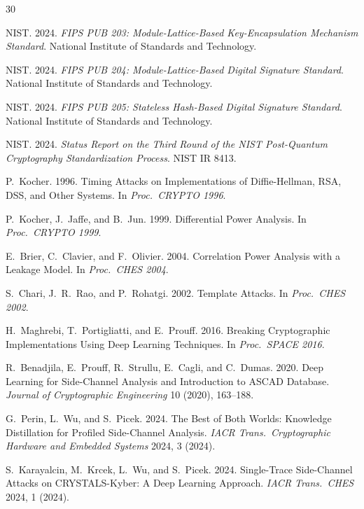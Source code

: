 \documentclass[sigconf,nonacm]{acmart}
\begin{document}
\sloppy

\begin{thebibliography}{30}

NIST. 2024. \textit{FIPS PUB 203: Module-Lattice-Based Key-Encapsulation
Mechanism Standard}. National Institute of Standards and Technology.

NIST. 2024. \textit{FIPS PUB 204: Module-Lattice-Based Digital
Signature Standard}. National Institute of Standards and Technology.

NIST. 2024. \textit{FIPS PUB 205: Stateless Hash-Based Digital
Signature Standard}. National Institute of Standards and Technology.

NIST. 2024. \textit{Status Report on the Third Round of the NIST
Post-Quantum Cryptography Standardization Process}. NIST IR 8413.

P.~Kocher. 1996. Timing Attacks on Implementations of Diffie-Hellman,
RSA, DSS, and Other Systems. In \textit{Proc.\ CRYPTO 1996}.

P.~Kocher, J.~Jaffe, and B.~Jun. 1999. Differential Power Analysis.
In \textit{Proc.\ CRYPTO 1999}.

E.~Brier, C.~Clavier, and F.~Olivier. 2004. Correlation Power Analysis
with a Leakage Model. In \textit{Proc.\ CHES 2004}.

S.~Chari, J.~R.~Rao, and P.~Rohatgi. 2002. Template Attacks. In
\textit{Proc.\ CHES 2002}.

H.~Maghrebi, T.~Portigliatti, and E.~Prouff. 2016. Breaking
Cryptographic Implementations Using Deep Learning Techniques.
In \textit{Proc.\ SPACE 2016}.

R.~Benadjila, E.~Prouff, R.~Strullu, E.~Cagli, and C.~Dumas. 2020.
Deep Learning for Side-Channel Analysis and Introduction to ASCAD
Database. \textit{Journal of Cryptographic Engineering} 10 (2020),
163--188.

G.~Perin, L.~Wu, and S.~Picek. 2024. The Best of Both Worlds:
Knowledge Distillation for Profiled Side-Channel Analysis.
\textit{IACR Trans.\ Cryptographic Hardware and Embedded Systems}
2024, 3 (2024).

S.~Karayalcin, M.~Krcek, L.~Wu, and S.~Picek. 2024. Single-Trace
Side-Channel Attacks on CRYSTALS-Kyber: A Deep Learning Approach.
\textit{IACR Trans.\ CHES} 2024, 1 (2024).


\end{thebibliography}
\end{document}
